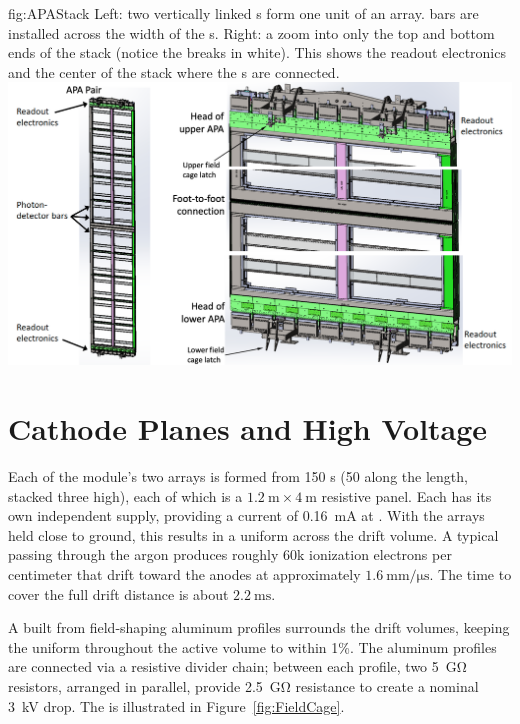 \begin{dunefigure}{fig:APAStack}
{Left: two vertically linked s form one unit of an  array.  bars are installed across the width of the s. Right: a zoom into only the top and bottom ends of the  stack (notice the breaks in white). This shows the readout electronics and the center of the stack where the s are connected.}
\includegraphics[width=\textwidth]{graphics/APAStack.png}
\end{dunefigure}

\section{Cathode Planes and High Voltage}

Each of the module's two  arrays is formed from 150 s (50 along the length, stacked three high), each of which is a $\SI{1.2}{\meter}\times\SI{4}{\meter}$ resistive panel. Each  has its own independent  supply, providing a current of \SI{0.16}{\milli\ampere} at \sptargetdriftvolt{}. 
With the   arrays held close to ground, this results in a uniform \spmaxfield \efield across the drift volume.  A typical  passing through the argon produces roughly 60k ionization electrons per centimeter that drift toward the anodes at approximately $\SI{1.6}{\mm/\micro\second}$. The time to cover the full drift distance is about $\SI{2.2}{\milli\second}$.

A  built from field-shaping aluminum profiles surrounds the drift volumes, keeping  the \efield uniform throughout the active  volume to within 1\%.  The aluminum profiles are connected via a resistive divider chain; between each profile, two \SI{5}{\giga\ohm} resistors, arranged in parallel, provide  \SI{2.5}{\giga\ohm} resistance to create a nominal \SI{3}{\kilo\volt} drop. The  is illustrated in Figure~\ref{fig:FieldCage}.

